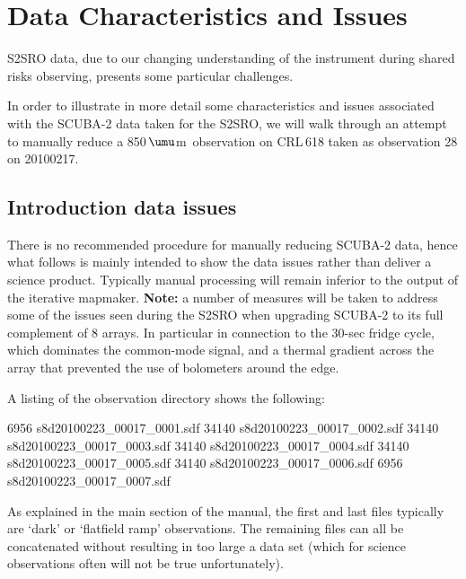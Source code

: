 \documentclass[twoside,11pt]{starlink}
\providecommand{\micron}{\mbox{\,${\umu}$m}}            %
\begin{document}
\newpage
\appendix

\section{Data Characteristics and Issues}
\label{sec:Issues}

S2SRO data, due to our changing understanding of the instrument during
shared risks observing, presents some particular challenges.

In order to illustrate in more detail some characteristics and issues
associated with the SCUBA-2 data taken for the S2SRO, we will walk
through an attempt to manually reduce a 850\micron\ observation on
CRL\,618 taken as observation 28 on 20100217.

\subsection{Introduction data issues}
\label{sec:intro2}

There is no recommended procedure for manually reducing SCUBA-2 data,
hence what follows is mainly intended to show the data issues rather
than deliver a science product. Typically manual processing will
remain inferior to the output of the iterative mapmaker. \textbf{Note:}
a number of measures will be taken to address some of the issues seen
during the S2SRO when upgrading SCUBA-2 to its full complement of 8
arrays. In particular in connection to the 30-sec fridge cycle, which
dominates the common-mode signal, and a thermal gradient across the
array that prevented the use of bolometers around the edge.

A listing of the observation directory shows the following:

\begin{terminalv}
 6956 s8d20100223_00017_0001.sdf
34140 s8d20100223_00017_0002.sdf
34140 s8d20100223_00017_0003.sdf
34140 s8d20100223_00017_0004.sdf
34140 s8d20100223_00017_0005.sdf
34140 s8d20100223_00017_0006.sdf
 6956 s8d20100223_00017_0007.sdf
\end{terminalv}

As explained in the main section of the manual, the first and last
files typically are `dark' or `flatfield ramp' observations. The
remaining files can all be concatenated without resulting in too large
a data set (which for science observations often will not be true
unfortunately).

\begin{terminalv}
\end{terminalv}
\end{document}
